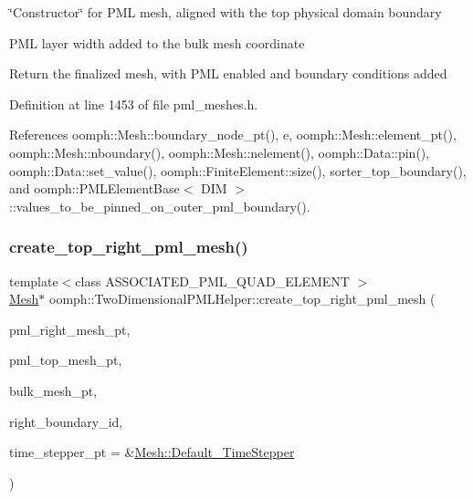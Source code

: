 \char`\"{}\+Constructor\char`\"{} for P\+ML mesh, aligned with the top physical domain boundary 

P\+ML layer width added to the bulk mesh coordinate

Return the finalized mesh, with P\+ML enabled and boundary conditions added 

Definition at line 1453 of file pml\+\_\+meshes.\+h.



References oomph\+::\+Mesh\+::boundary\+\_\+node\+\_\+pt(), e, oomph\+::\+Mesh\+::element\+\_\+pt(), oomph\+::\+Mesh\+::nboundary(), oomph\+::\+Mesh\+::nelement(), oomph\+::\+Data\+::pin(), oomph\+::\+Data\+::set\+\_\+value(), oomph\+::\+Finite\+Element\+::size(), sorter\+\_\+top\+\_\+boundary(), and oomph\+::\+P\+M\+L\+Element\+Base$<$ D\+I\+M $>$\+::values\+\_\+to\+\_\+be\+\_\+pinned\+\_\+on\+\_\+outer\+\_\+pml\+\_\+boundary().

\mbox{\label{namespaceoomph_1_1TwoDimensionalPMLHelper_a3e37eb00dd89dad4cc51531472c9b1ad}} 
\subsubsection{\texorpdfstring{create\+\_\+top\+\_\+right\+\_\+pml\+\_\+mesh()}{create\_top\_right\_pml\_mesh()}}
{\footnotesize\ttfamily template$<$class A\+S\+S\+O\+C\+I\+A\+T\+E\+D\+\_\+\+P\+M\+L\+\_\+\+Q\+U\+A\+D\+\_\+\+E\+L\+E\+M\+E\+NT $>$ \\
\hyperlink{classoomph_1_1Mesh}{Mesh}$\ast$ oomph\+::\+Two\+Dimensional\+P\+M\+L\+Helper\+::create\+\_\+top\+\_\+right\+\_\+pml\+\_\+mesh (\begin{DoxyParamCaption}\item[{\hyperlink{classoomph_1_1Mesh}{Mesh} $\ast$}]{pml\+\_\+right\+\_\+mesh\+\_\+pt,  }\item[{\hyperlink{classoomph_1_1Mesh}{Mesh} $\ast$}]{pml\+\_\+top\+\_\+mesh\+\_\+pt,  }\item[{\hyperlink{classoomph_1_1Mesh}{Mesh} $\ast$}]{bulk\+\_\+mesh\+\_\+pt,  }\item[{const unsigned \&}]{right\+\_\+boundary\+\_\+id,  }\item[{\hyperlink{classoomph_1_1TimeStepper}{Time\+Stepper} $\ast$}]{time\+\_\+stepper\+\_\+pt = {\ttfamily \&\hyperlink{classoomph_1_1Mesh_a12243d0fee2b1fcee729ee5a4777ea10}{Mesh\+::\+Default\+\_\+\+Time\+Stepper}} }\end{DoxyParamCaption})}



